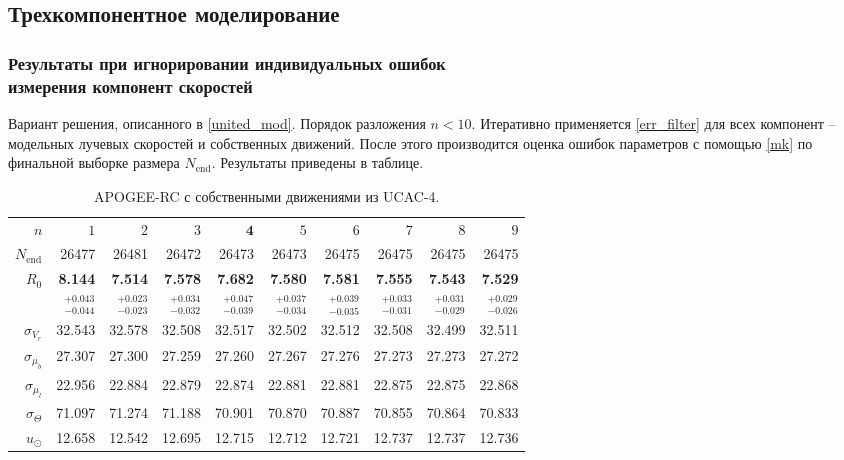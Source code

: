 \documentclass{matmex-diploma-custom}
\begin{document}
\pagebreak
\subsection{Трехкомпонентное моделирование}
\subsubsection{Результаты при игнорировании индивидуальных ошибок \\ измерения компонент скоростей}
Вариант решения, описанного в \ref{united_mod}. Порядок разложения $n < 10$. Итеративно применяется \ref{err_filter} для всех компонент -- модельных лучевых скоростей и собственных движений. После этого производится оценка ошибок параметров с помощью \ref{mk} по финальной выборке размера $N_{\mathrm{end}}$. Результаты приведены в таблице. 
\begin{table}[h!!]
\centering
\caption{APOGEE-RC с собственными движениями из UCAC-4.}
\begin{tabular}{r|rr|rrr|rrrr}
\hline
$n$ & $1$ & $2$ & $3$ & $\textbf{4}$ & $5$&$ 6 $&$ 7 $&$ 8 $&$ 9 $\\
 $N_{\mathrm{end}}$ & 26477       &    26481 &    26472 &    26473 &    26473 &    26475 &    26475 &    26475 &    26475 \\
 $R_0 $&  \textbf{8.144}       &   \textbf{ 7.514} &    \textbf{7.578} &    \textbf{7.682} &  \textbf{   7.580} &  \textbf{  7.581} &  \textbf{  7.555} &  \textbf{  7.543} &  \textbf{  7.529} \\
       & $_{-0.044}^{+0.043} $ & $_{-0.023}^{+0.023}$ & $_{-0.032}^{+0.034}$   & $_{-0.039}^{+0.047}$  & $_{-0.034}^{+0.037}$  & $_{-0.035}^{+0.039}$  & $_{-0.031}^{+0.033}$  & $_{-0.029}^{+0.031}$  & $_{-0.026}^{+0.029}$  \\\hline
 $\sigma_{V_r} $& 32.543      &  32.578 &  32.508 &  32.517 &  32.502 &  32.512 &  32.508 &  32.499 &  32.511  \\ 
 $\sigma_{\mu_b} $& 27.307      &  27.300 &  27.259 &  27.260 &  27.267 &  27.276 &  27.273 &  27.273 &  27.272  \\ 
 $\sigma_{\mu_l} $& 22.956      &  22.884 &  22.879 &  22.874 &  22.881 &  22.881 &  22.875 &  22.875 &  22.868  \\\hline 
 $\sigma_{\Theta} $& 71.097      &  71.274 &  71.188 &  70.901 &  70.870 &  70.887 &  70.855 &  70.864 &  70.833  \\\hline 
 $ u_{\odot} $& 12.658      &   12.542 &   12.695 &   12.715 &   12.712 &   12.721 &   12.737 &   12.737 &   12.736 \\

\end{tabular}
\end{table}
\end{document}
